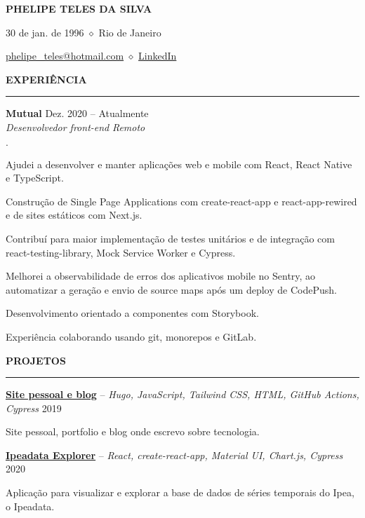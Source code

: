\documentclass[11pt,letterpaper]{article}
\newenvironment{tightlist}
  {\begin{list}
    {$\cdot$}
    {
      \setlength{\leftmargin}{0em}
      \setlength{\itemsep}{-\smallskipamount}
    }
  }
{\end{list}}
\begin{document}
\pagestyle{empty}

\centerline{\huge\bf PHELIPE TELES DA SILVA}
\medskip

\centerline{30 de jan. de 1996 $\diamond$ Rio de Janeiro}
\smallskip

\centerline{
  \href{mailto:phelipe_teles@hotmail.com}{phelipe\_teles@hotmail.com}
  $\diamond$
  \href{https://linkedin.com/in/phelipeteles}{LinkedIn}
}
\smallskip

\medskip \textbf{EXPERIÊNCIA} \medskip
\hrule

\textbf{Mutual} \hfill Dez. 2020 -- Atualmente \\
\emph{Desenvolvedor front-end} \hfill \emph{Remoto} {\parfillskip=0pt\par}

\begin{tightlist}
  \item Ajudei a desenvolver e manter aplicações web e mobile com React, React
    Native e TypeScript.
  \item Construção de Single Page Applications com create-react-app e
    react-app-rewired e de sites estáticos com Next.js.
  \item Contribuí para maior implementação de testes unitários e de integração
    com react-testing-library, Mock Service Worker e Cypress.
  \item Melhorei a observabilidade de erros dos aplicativos mobile no Sentry, ao
    automatizar a geração e envio de source maps após um deploy de CodePush.
  \item Desenvolvimento orientado a componentes com Storybook.
  \item Experiência colaborando usando git, monorepos e GitLab.
\end{tightlist}

\medskip \textbf{PROJETOS} \medskip
\hrule

\textbf{\href{https://phelipetls.github.io}{Site pessoal e blog}} -- \emph{Hugo, JavaScript, Tailwind CSS, HTML, GitHub Actions, Cypress} \hfill 2019
{\parfillskip=0pt\par}
Site pessoal, portfolio e blog onde escrevo sobre tecnologia.

\smallskip

\textbf{\href{http://ipeadata-explorer.surge.sh}{Ipeadata Explorer}} -- \emph{React, create-react-app, Material UI, Chart.js, Cypress} \hfill 2020
{\parfillskip=0pt\par}
Aplicação para visualizar e explorar a base de dados de séries temporais do Ipea, o Ipeadata.
\end{document}

